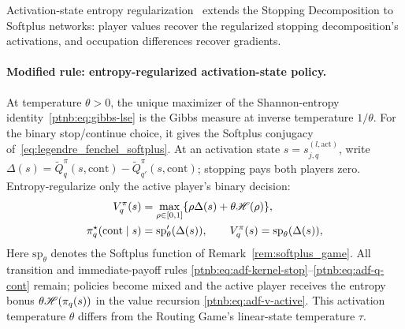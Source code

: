 Activation-state entropy regularization~\parencite{Gaubert2025} extends the Stopping Decomposition
to Softplus networks: player values recover the regularized stopping decomposition's activations, and occupation differences recover
gradients.

\paragraph{Modified rule: entropy-regularized activation-state policy.}\label{ptnb:app:softplus-rules}
At temperature $\theta>0$, the unique maximizer of the Shannon-entropy identity~\eqref{ptnb:eq:gibbs-lse} is the Gibbs measure at inverse temperature $1/\theta$. For the binary stop/continue choice, it gives the Softplus
conjugacy of~\eqref{eq:legendre_fenchel_softplus}.
At an activation state $s=s_{j,q}^{(l,\mathrm{act})}$, write
$\Delta(s)=\tilde Q_q^\pi(s,\mathrm{cont})-\tilde Q_{q'}^\pi(s,\mathrm{cont})$; stopping pays both
players zero. Entropy-regularize only the active player's binary decision:
\begin{align}
    V_q^\pi(s)&=\max_{\rho\in[0,1]}\{\rho\Delta(s)+\theta\mathscr{H}(\rho)\},\label{ptnb:eq:softplus-soft-bellman}\\
    \pi_q^\star(\mathrm{cont}\mid s)&=\mathrm{sp}'_\theta(\Delta(s)),\qquad
    V_q^\pi(s)=\mathrm{sp}_\theta(\Delta(s)),\label{ptnb:eq:softplus-policy}
\end{align}
Here $\mathrm{sp}_\theta$ denotes the Softplus function of Remark~\ref{rem:softplus_game}. All transition and immediate-payoff rules
\eqref{ptnb:eq:adf-kernel-stop}--\eqref{ptnb:eq:adf-q-cont} remain; policies become mixed and the
active player receives the entropy bonus $\theta\mathscr{H}(\pi_q(s))$ in the value recursion
\eqref{ptnb:eq:adf-v-active}. This activation temperature $\theta$ differs from the Routing Game's
linear-state temperature $\tau$.

